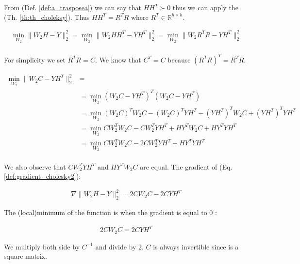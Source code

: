 From (Def. \ref{def:a_trasposea}) we can say that $HH^T \succ 0$ thus we can apply the (Th. \ref{th:th_choleksy}). Thus $HH^T = R^TR$ where $R^T \in \mathbb{R}^{h \times h}$.

\begin{equation}
    \label{def:gradient_cholesky1}
    \begin{aligned}
        \min_{W_2} \|W_2H - Y\|_2^2 = \min_{W_2} \|W_2HH^T- YH^T\|_2^2 = \min_{W_2} \|W_2R^TR- YH^T\|_2^2\\
    \end{aligned}
\end{equation}

For simplicity we set $R^TR = C$. We know that $C^T = C$ because $(R^TR)^T = R^TR$.

\begin{equation}
    \label{def:gradient_cholesky2}
    \begin{aligned}
        \min_{W_2} \|W_2C- YH^T\|_2^2 &= \\
        &= \min_{W_2} (W_2C - YH^T)^T(W_2C - YH^T)\\
        &= \min_{W_2} (W_2C)^TW_2C - (W_2C)^TYH^T - (YH^T)^TW_2C + (YH^T)^TYH^T \\
        &= \min_{W_2} CW_2^TW_2C - CW_2^TYH^T + HY^TW_2C + HY^TYH^T \\ 
        &= \min_{W_2} CW_2^TW_2C - 2CW_2^TYH^T + HY^TYH^T \\ 
    \end{aligned}
\end{equation}

We also observe that $CW_2^TYH^T$ and $HY^TW_2C$ are equal. The gradient of (Eq. \ref{def:gradient_cholesky2}):

\begin{equation}
    \begin{aligned}
       \nabla \|W_2H- Y\|_2^2 = 2CW_2C - 2CYH^T 
    \end{aligned}
\end{equation}

The (local)minimum of the function is when the gradient is equal to 0 :

\begin{equation}
    \begin{aligned}
        2CW_2C = 2CYH^T
    \end{aligned}
\end{equation}

We multiply both side by $C^{-1}$ and divide by 2. $C$ is always invertible since is a square matrix.


